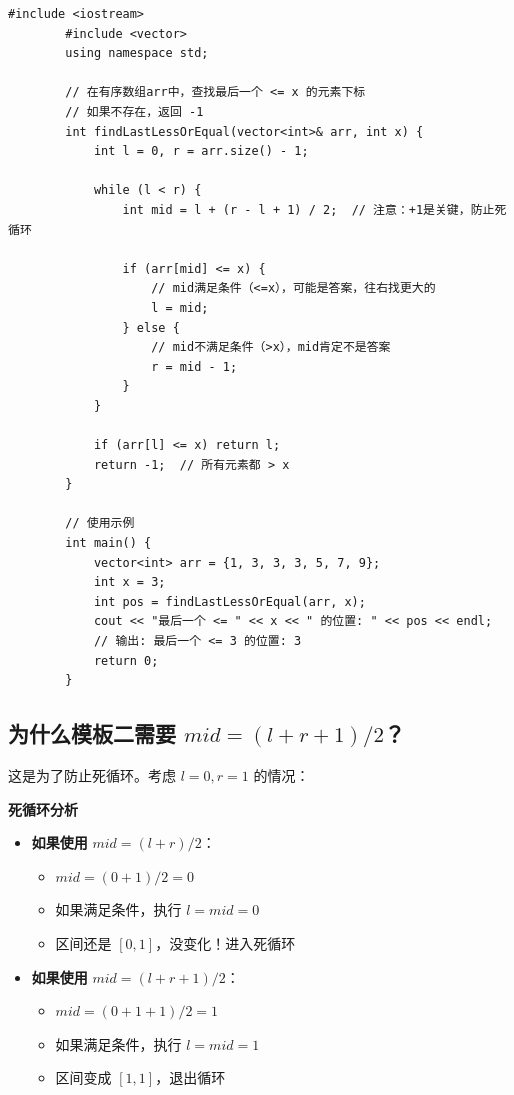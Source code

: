 \documentclass[12pt,a4paper]{article}
\begin{document}
	\begin{lstlisting}[caption={模板2：查找最后一个 <= x 的元素}]
		#include <iostream>
		#include <vector>
		using namespace std;
		
		// 在有序数组arr中，查找最后一个 <= x 的元素下标
		// 如果不存在，返回 -1
		int findLastLessOrEqual(vector<int>& arr, int x) {
			int l = 0, r = arr.size() - 1;
			
			while (l < r) {
				int mid = l + (r - l + 1) / 2;  // 注意：+1是关键，防止死循环
				
				if (arr[mid] <= x) {
					// mid满足条件（<=x），可能是答案，往右找更大的
					l = mid;
				} else {
					// mid不满足条件（>x），mid肯定不是答案
					r = mid - 1;
				}
			}
			
			if (arr[l] <= x) return l;
			return -1;  // 所有元素都 > x
		}
		
		// 使用示例
		int main() {
			vector<int> arr = {1, 3, 3, 3, 5, 7, 9};
			int x = 3;
			int pos = findLastLessOrEqual(arr, x);
			cout << "最后一个 <= " << x << " 的位置: " << pos << endl;
			// 输出: 最后一个 <= 3 的位置: 3
			return 0;
		}
	\end{lstlisting}
	
	\subsection{为什么模板二需要 $mid = (l + r + 1) / 2$？}
	
	这是为了防止死循环。考虑 $l = 0, r = 1$ 的情况：
	
	\begin{redbox}
		\textbf{死循环分析}
		
		\begin{itemize}
			\item \textbf{如果使用} $mid = (l + r) / 2$：
			\begin{itemize}
				\item $mid = (0 + 1) / 2 = 0$
				\item 如果满足条件，执行 $l = mid = 0$
				\item 区间还是 $[0, 1]$，没变化！进入死循环
			\end{itemize}
			\item \textbf{如果使用} $mid = (l + r + 1) / 2$：
			\begin{itemize}
				\item $mid = (0 + 1 + 1) / 2 = 1$
				\item 如果满足条件，执行 $l = mid = 1$
				\item 区间变成 $[1, 1]$，退出循环
			\end{itemize}
		\end{itemize}
	\end{redbox}
	
\end{document}
